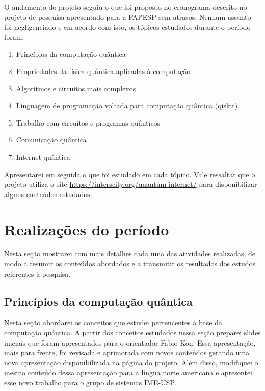 \documentclass{article}
\begin{document}
     O andamento do projeto seguiu o que foi proposto no cronograma descrito no projeto de pesquisa apresentado para a FAPESP sem atrasos. Nenhum assunto foi negligenciado e em acordo com isto, os tópicos estudados durante o período foram:
    \begin{enumerate}
        
        \item Princípios da computação quântica
        \item Propriedades da física quântica aplicadas à computação
        \item Algoritmos e circuitos mais complexos
        \item Linguagem de programação voltada para computação quântica (qiskit)
        \item Trabalho com circuitos e programas quânticos
        \item Comunicação quântica
        \item Internet quântica
    \end{enumerate}
    
    Apresentarei em seguida o que foi estudado em cada tópico. Vale ressaltar que o projeto utiliza o site \href{https://interscity.org/quantum-internet/}{https://interscity.org/quantum-internet/} para disponibilizar alguns conteúdos estudados.
 
\newpage

\section{Realizações do período}
    Nesta seção mostrarei com mais detalhes cada uma das atividades realizadas, de modo a resumir os conteúdos abordados e a transmitir os resultados dos estudos referentes à pesquisa.
    
    \subsection{Princípios da computação quântica}
    Nesta seção abordarei os conceitos que estudei pertencentes à base da computação quântica. A partir dos conceitos estudados nessa seção preparei slides iniciais que foram apresentados para o orientador Fabio Kon. Essa apresentação, mais para frente, foi revisada e aprimorada com novos conteúdos gerando uma nova apresentação disponibilizada na  \href{https://interscity.org/quantum-internet/}{página do projeto}. Além disso, modifiquei o mesmo conteúdo dessa apresentação para a língua norte americana e apresentei esse novo trabalho para o grupo de sistemas IME-USP.
\end{document}
